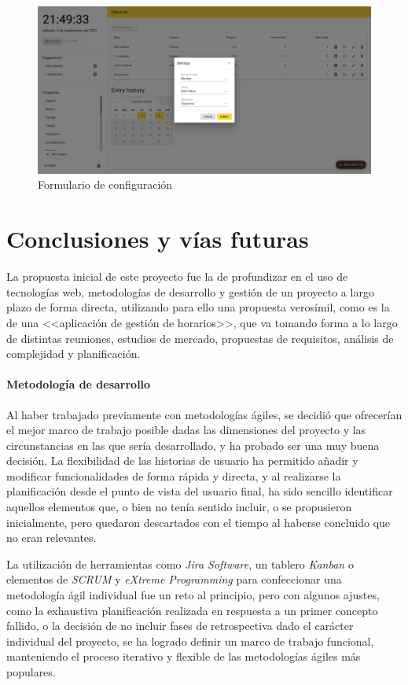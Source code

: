 \documentclass[10pt, a4paper]{aqademic}
\begin{document}
\begin{figure}[hbt!]
	\centering
	\includegraphics[scale=0.25]{img/demo-ajustes-1.png}
	\caption{Formulario de configuración}
\end{figure}

\chapter{Conclusiones y vías futuras}

La propuesta inicial de este proyecto fue la de profundizar en el uso de tecnologías web, metodologías de desarrollo y gestión de un proyecto a largo plazo
de forma directa, utilizando para ello una propuesta verosímil, como es la de una <<aplicación de gestión de horarios>>, que va tomando forma a lo largo de distintas reuniones, estudios de mercado, propuestas de requisitos, análisis de complejidad y planificación. 


\subsubsection*{Metodología de desarrollo}

Al haber trabajado previamente con metodologías ágiles, se decidió que ofrecerían el mejor marco de trabajo posible dadas las dimensiones del proyecto y las circunstancias en las que sería desarrollado, y ha probado ser una muy buena decisión. La flexibilidad de las historias de usuario ha permitido añadir y modificar funcionalidades de forma rápida y directa, y al realizarse la planificación desde el punto de vista del usuario final, ha sido sencillo identificar aquellos elementos que, o bien no tenía sentido incluir, o se propusieron inicialmente, pero quedaron descartados con el tiempo al haberse concluido que no eran relevantes.

La utilización de herramientas como \textit{Jira Software}, un tablero \textit{Kanban} o elementos de \textit{SCRUM} y \textit{eXtreme Programming} para confeccionar una metodología ágil individual fue un reto al principio, pero con algunos ajustes, como la exhaustiva planificación realizada en respuesta a un primer concepto fallido, o la decisión de no incluir fases de retrospectiva dado el carácter individual del proyecto, se ha logrado definir un marco de trabajo funcional, manteniendo el proceso iterativo y flexible de las metodologías ágiles más populares.
\end{document}
